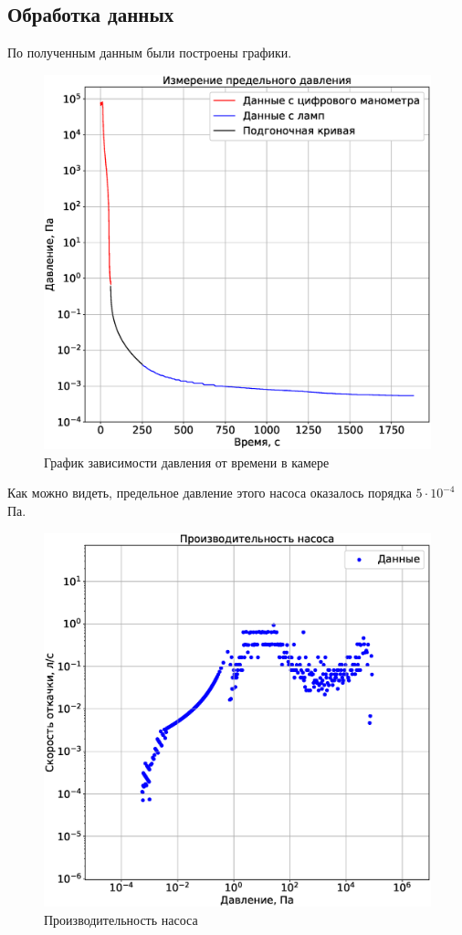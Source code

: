 \documentclass[a4paper,14pt]{extarticle}
\begin{document}
		\subsection{Обработка данных}
			По полученным данным были построены графики.
			\begin{figure}[h!]
				\centering
				\includegraphics[width=.75\linewidth]{Lab1_1.eps}
				\caption{График зависимости давления от времени в камере}
				\label{fig1}
			\end{figure}
			\newline
			
			Как можно видеть, предельное давление этого насоса оказалось порядка $5 \cdot 10 ^ {-4}$ Па.
			\newpage 
			\begin{figure}[h!]
				\centering
				\includegraphics[width=.75\linewidth]{Lab1_2.eps}
				\caption{Производительность насоса}
				\label{fig1}
			\end{figure}
		
\end{document}
